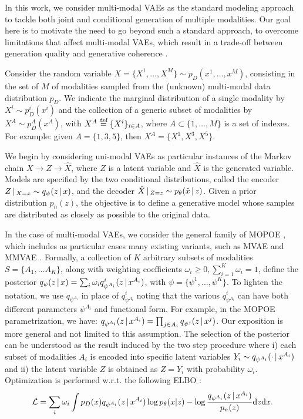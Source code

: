 

In this work, we consider multi-modal \glspl{VAE} \citep{mvaeWu2018, mmvaeShi2019, sutter2021generalized, palumbo2023mmvae} as the standard modeling approach to tackle both joint and conditional generation of multiple modalities. Our goal here is to motivate the need to go beyond such a standard approach, to overcome limitations that affect multi-modal \glspl{VAE}, which result in a trade-off between generation quality and generative coherence \citep{Daunhawer2021, palumbo2023mmvae}.

Consider the random variable $X=\{X^{1},\dots,X^{M}\} \sim p_{D}(x^1,\dots,x^M)$, consisting in the set of $M$ of modalities sampled from the (unknown) multi-modal data distribution $p_{D}$. We indicate the marginal distribution of a single modality by $X^i \sim p_D^i(x^i)$ and the collection of a generic subset of modalities by $X^{A}\sim p_D^A(x^A)$, with $X^{A} \defeq \{X^i \}_{i\in A}$, where $A\subset \{1,\dots,M\}$ is a set of indexes. For example: given $A=\{1,3,5\}$, then $X^{A} = \{X^1, X^3, X^5\}$.

We begin by considering uni-modal \glspl{VAE} as particular instances of the Markov chain $X\rightarrow Z\rightarrow \hat{X}$, where $Z$ is a latent variable and $\hat{X}$ is the generated variable. Models are specified by the two conditional distributions, called the encoder $Z\,|\,_{X=x}\sim q_\psi(z\,|\, x)$, and the decoder $\hat{X}\,|\,_{Z=z}\sim p_\theta(\hat{x}\,|\, z)$. 
Given a prior distribution $p_n(z)$, the objective is to define a generative model whose samples are distributed as closely as possible to the original data. 

In the case of multi-modal \glspl{VAE}, we consider the general family of \gls{MOPOE} \citep{sutter2021generalized}, which includes as particular cases many existing variants, such as \gls{MVAE} \citep{mvaeWu2018} and \gls{MMVAE} \citep{mmvaeShi2019}. Formally,  a collection of $K$ arbitrary subsets of modalities $S=\{A_1,\dots A_K\}$, along with weighting coefficients $\omega_i\geq 0,\sum_{i=1}^{K}\omega_i=1$, define the posterior $q_\psi(z\,|\, x)=\sum_i \omega_i q^i_{\psi^{A_i}}(z\,|\, x^{A_i})$, with $\psi=\{\psi^1,\dots,\psi^K\}$. 
To lighten the notation, we use $q_{\psi^{A_i}}$ in place of $q^i_{\psi^{A_i}}$ noting that the various $q^i_{\psi^{A_i}}$ can have both different parameters $\psi^{A_i}$ and functional form. For example, in the \gls{MOPOE} \citep{sutter2021generalized} parametrization, we have: $q_{\psi^{A_i}}(z\,|\, x^{A_i})=\prod_{j\in A_i}q_{\psi^j}(z\,|\, x^{j})$. Our exposition is more general and not limited to this assumption.
The selection of the posterior can be understood as the result induced by the two step procedure where i) each subset of modalities $A_i$ is encoded into specific latent variables $Y_i\sim q_{\psi^{A_i}}(\cdot \,|\, x^{A_i})$ and ii) the latent variable $Z$ is obtained as $Z=Y_i$ with probability $\omega_i$. 
Optimization is performed w.r.t. the following \gls{ELBO} \citep{Daunhawer2021, sutter2021generalized}:
\begin{equation}\label{eq:elbo_M}
    \mathcal{L}=\sum\limits_i \omega_i \int p_D(x)q_{\psi^{A_i}}(z\,|\, x^{A_i})\log p_{\theta}(x|z)-\log\frac{q_{\psi^{A_i}}(z\,|\, x^{A_i})}{p_n(z)}\dd z\dd x.
\end{equation}

